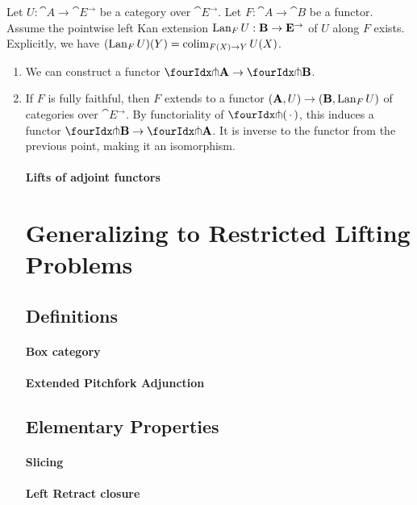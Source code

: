 \documentclass[reqno,10pt,a4paper,oneside]{amsart}
\begin{document}
Let $U : \cat{A} \to \cat{E}^{\to}$ be a category over $\cat{E}^{\to}$.
Let $F : \cat{A} \to \cat{B}$ be a functor.
Assume the pointwise left Kan extension $\operatorname{Lan}_F U : \mathbf{B} \to \mathbf{E}^{\to}$ of $U$ along $F$ exists.
Explicitly, we have $(\operatorname{Lan}_F U)(Y) = \operatorname{colim}_{F(X) \to Y} U(X)$.
\begin{enumerate}
\item
We can construct a functor $\liftr{\cat{A}} \to \liftr{\cat{B}}$.
\item
If $F$ is fully faithful, then $F$ extends to a functor $(\mathbf{A}, U) \to (\mathbf{B}, \operatorname{Lan}_F U)$ of categories over $\cat{E}^{\to}$.
By functoriality of $\liftr{\brarghole}$, this induces a functor $\liftr{\cat{B}} \to \liftr{\cat{A}}$.
It is inverse to the functor from the previous point, making it an isomorphism.

\paragraph{Lifts of adjoint functors}

\section{Generalizing to Restricted Lifting Problems}

\subsection{Definitions}

\paragraph{Box category}

\paragraph{Extended Pitchfork Adjunction}

\subsection{Elementary Properties}

\paragraph{Slicing}

\paragraph{Left Retract closure}


\end{enumerate}
\end{document}
